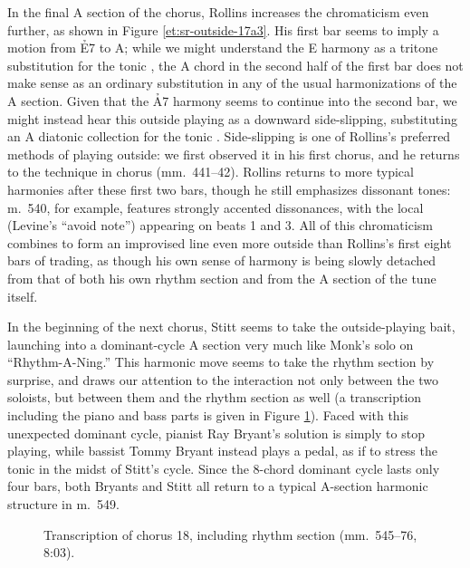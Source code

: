 In the final A section of the chorus, Rollins increases the chromaticism even
further, as shown in Figure \ref{et:sr-outside-17a3}. His first bar seems to
imply a motion from \h{E7} to A; while we might understand the E harmony as a
tritone substitution for the tonic \Bflat, the A chord in the second half of
the first bar does not make sense as an ordinary substitution in any of the
usual harmonizations of the A section. Given that the \h{A7} harmony seems to
continue into the second bar, we might instead hear this outside playing as a
downward side-slipping, substituting an A diatonic collection for the tonic
\Bflat. Side-slipping is one of Rollins's preferred methods of playing
outside: we first observed it in his first chorus, and he returns to the
technique in chorus  (mm.~441--42). Rollins returns to more
typical harmonies after these first two bars, though he still emphasizes
dissonant tones: m.~540, for example, features strongly accented dissonances,
with the local  (Levine's ``avoid note'') appearing on beats 1 and 3. All
of this chromaticism combines to form an improvised line even more outside
than Rollins's first eight bars of trading, as though his own sense of harmony
is being slowly detached from that of both his own rhythm section and from the
A section of the tune itself.

In the beginning of the next chorus, Stitt seems to take the outside-playing
bait, launching into a dominant-cycle A section very much like Monk's solo on
``Rhythm-A-Ning.'' This harmonic move seems to take the rhythm section by
surprise, and draws our attention to the interaction not only between the two
soloists, but between them and the rhythm section as well (a transcription
including the piano and bass parts is given in Figure
\ref{et:rhythm-sect-c18}). Faced with this unexpected dominant cycle, pianist
Ray Bryant's solution is simply to stop playing, while bassist Tommy Bryant
instead plays a \Bflat pedal, as if to stress the tonic in the midst of
Stitt's cycle. Since the 8-chord dominant cycle lasts only four bars, both
Bryants and Stitt all return to a typical A-section harmonic structure in m.~549.

\begin{figure}[p]
  \caption[Transcription of chorus 18, including rhythm section.]{%
    Transcription of chorus 18, including rhythm section (mm.~545--76, 8:03).}
  \label{et:rhythm-sect-c18}
\end{figure}


